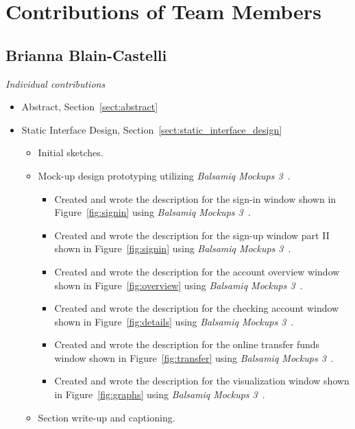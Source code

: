 \section{Contributions of Team Members}
\label{sect:contributions}
\subsection{Brianna Blain-Castelli}
\emph{Individual contributions}
\begin{itemize}
    \item {Abstract, Section~\ref{sect:abstract}}
    \item {Static Interface Design, Section~\ref{sect:static_interface_design}}
    \begin{itemize}
        \item {Initial sketches.}
        \item {Mock-up design prototyping utilizing \emph{Balsamiq Mockups 3}~\cite{BALSAMIQ_MOCKUPS_3:1}.}
            \begin{itemize}
                \item {Created and wrote the description for the sign-in window shown in Figure~\ref{fig:signin} using \emph{Balsamiq Mockups 3}~\cite{BALSAMIQ_MOCKUPS_3:1}.}
                \item {Created and wrote the description for the sign-up window part II shown in Figure~\ref{fig:signin} using \emph{Balsamiq Mockups 3}~\cite{BALSAMIQ_MOCKUPS_3:1}.}
                \item {Created and wrote the description for the account overview window shown in Figure~\ref{fig:overview} using \emph{Balsamiq Mockups 3}~\cite{BALSAMIQ_MOCKUPS_3:1}.}
                \item {Created and wrote the description for the checking account window shown in Figure~\ref{fig:details} using \emph{Balsamiq Mockups 3}~\cite{BALSAMIQ_MOCKUPS_3:1}.}
                \item {Created and wrote the description for the online transfer funds window shown in Figure~\ref{fig:transfer} using \emph{Balsamiq Mockups 3}~\cite{BALSAMIQ_MOCKUPS_3:1}.}
                \item {Created and wrote the description for the visualization window shown in Figure~\ref{fig:graphs} using \emph{Balsamiq Mockups 3}~\cite{BALSAMIQ_MOCKUPS_3:1}.}
            \end{itemize}
        \item {Section write-up and captioning.}
        \end{itemize}
\end{itemize}
